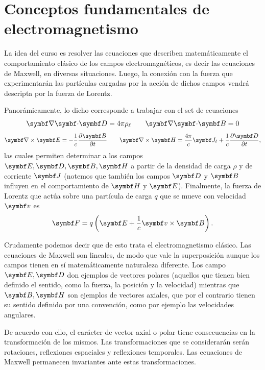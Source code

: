 \documentclass[10pt,oneside]{CBFT_book}
\begin{document}
\chapter{Conceptos fundamentales de electromagnetismo}



La idea del curso es resolver las ecuaciones que describen matemáticamente el comportamiento clásico 
de los campos electromagnéticos, es decir las ecuaciones de Maxwell, en diversas situaciones.
Luego, la conexión con la fuerza que experimentarán las partículas cargadas por la acción de dichos
campos vendrá descripta por la fuerza de Lorentz.

Panorámicamente, lo dicho corresponde a trabajar con el set de ecuaciones
\[
	\divem{D} = 4 \pi \rho_\ell \qquad \divem{B} = 0 
\]
\[
	\rotorm{E} = - \frac{1}{c} \dpar{\vb{B}}{t} 
	\qquad 
	\rotorm{H} = \frac{4\pi}{c} \vb{J}_\ell + \frac{1}{c}\dpar{\vb{D}}{t},
\]
las cuales permiten determinar a los campos $\vb{E}, \vb{D}, \vb{B}, \vb{H}$ a partir de la densidad 
de carga $\rho$ y de corriente $\vb{J}$ (notemos que también los campos $\vb{D}$ y $\vb{B}$ influyen
en el comportamiento de $\vb{H}$ y $\vb{E}$).
Finalmente, la fuerza de Lorentz que actúa sobre una partícula de carga $q$ que se mueve con velocidad
$\vb{v}$ es
\[
	\vb{F} = q \left( \vb{E} + \frac{1}{c} \pv{v}{B} \right).
\]

Crudamente podemos decir que de esto trata el electromagnetismo clásico.
Las ecuaciones de Maxwell son lineales, de modo que vale la superposición aunque los campos tienen en
sí matemáticamente naturaleza diferente.
Los campo $\vb{E}, \vb{D}$ don ejemplos de vectores polares (aquellos que tienen bien definido el sentido,
como la fuerza, la posición y la velocidad) mientras que $\vb{B}, \vb{H}$ son ejemplos de vectores axiales,
que por el contrario tienen su sentido definido por una convención, como por ejemplo las velocidades
angulares.

De acuerdo con ello, el carácter de vector axial o polar tiene consecuencias en la transformación de
los mismos. Las transformaciones que se considerarán serán rotaciones, reflexiones espaciales y reflexiones
temporales. Las ecuaciones de Maxwell permanecen invariantes ante estas transformaciones.
\end{document}
